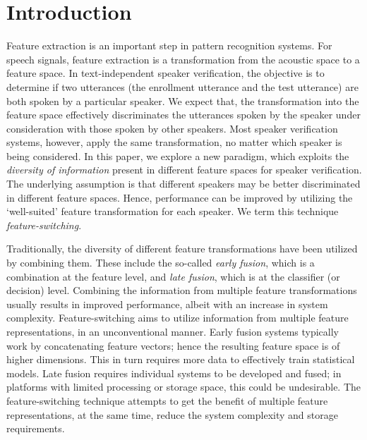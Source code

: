 \documentclass[preprint,12pt,5p]{elsarticle}
\begin{document}
\section{Introduction}
\label{sec:intro}
Feature extraction is an important step in pattern recognition systems. For
speech signals, feature extraction is a transformation from the acoustic space
to a feature space. In text-independent speaker verification, the objective is
to determine if two utterances (the enrollment utterance and the test utterance) are
both spoken by a particular speaker. We expect that, the transformation into the
feature space effectively discriminates the utterances spoken by the speaker
under consideration with those spoken by other speakers. Most speaker
verification systems, however, apply the same transformation, no matter which
speaker is being considered. In this paper, we explore a new paradigm, which
exploits the \emph{diversity of information} present in different feature spaces
for speaker verification. The underlying assumption is that different speakers
may be better discriminated in different feature spaces. Hence, performance can
be improved by utilizing the `well-suited' feature transformation for
each speaker. We term this technique \emph{feature-switching}. 


Traditionally, the diversity of different feature transformations have been
utilized by combining them. These include the so-called \emph{early fusion},
which is a combination at the feature level, and \emph{late fusion}, which is at
the classifier (or decision) level. Combining the information from multiple
feature transformations usually results in improved performance, albeit
with an increase in system complexity. Feature-switching aims to utilize
information from multiple feature representations, in an unconventional manner. 
Early fusion systems typically work by concatenating feature vectors;
hence the resulting feature space is of higher dimensions. This in turn requires
more data to effectively train statistical models. Late fusion requires
individual systems to be developed and fused; in platforms with limited
processing or storage space, this could be undesirable. The feature-switching
technique attempts to get the benefit of multiple feature representations, at the
same time, reduce the system complexity and storage requirements.
\end{document}
